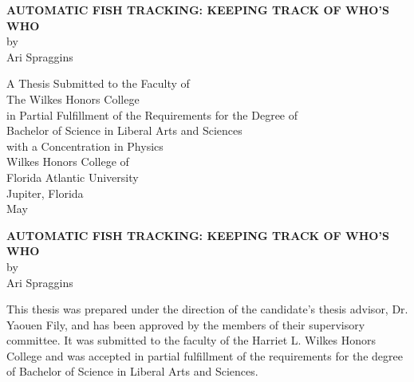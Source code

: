 \documentclass{article}
\begin{document}

\newcommand{\mytitle}{Automatic Fish Tracking: 
Keeping Track of Who’s Who}
\newcommand{\myauthor}{Ari Spraggins}

\newcommand{\myskip}{\vspace{0.5in}}
\newcommand{\layouttitle}[1]{{\bf\large\MakeUppercase{#1}}}
\setlength{\parindent}{0em}
\doublespace
{}
\thispagestyle{empty}

\begin{center}

	\vspace{4in} 
	\layouttitle{\mytitle} \\ by \\ \myauthor
	
	\vspace{1in}
	A Thesis Submitted to the Faculty of \\
	The Wilkes Honors College \\
	in Partial Fulfillment of the Requirements for the Degree of \\
	Bachelor of Science in Liberal Arts and Sciences \\
	with a Concentration in Physics \\ 
	\vspace{1in} 
	Wilkes Honors College of \\
	Florida Atlantic University \\
	Jupiter, Florida \\
	May \number\year

\end{center}

\newpage


\vspace{4in}
\begin{center}
	\layouttitle{\mytitle} \\
	by \\
	\myauthor
\end{center}

\singlespace
\vspace{1in}
This thesis was prepared under the direction of the candidate's thesis advisor, Dr. Yaouen Fily, and has been approved by the members of their supervisory committee. It was submitted to the faculty of the Harriet L. Wilkes Honors College and was accepted in partial fulfillment of the requirements for the degree of Bachelor of Science in Liberal Arts and Sciences.
\end{document}
